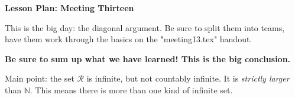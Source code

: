 \documentclass[12pt]{amsart}
\theoremstyle{definition}
\begin{document}
\begin{center}
\textbf{\Huge
Lesson Plan: Meeting Thirteen
}
\end{center}
\vspace{.5in}

This is the big day: the diagonal argument. 
Be sure to split them into teams, have them work through the basics on the "meeting13.tex" handout.

\textbf{Be sure to sum up what we have learned!
This is the big conclusion.}

Main point: the set $\mathcal{R}$ is infinite, but not countably infinite. 
It is \emph{strictly larger} than $\mathbb{N}$. 
This means there is more than one kind of infinite set.
\end{document}
